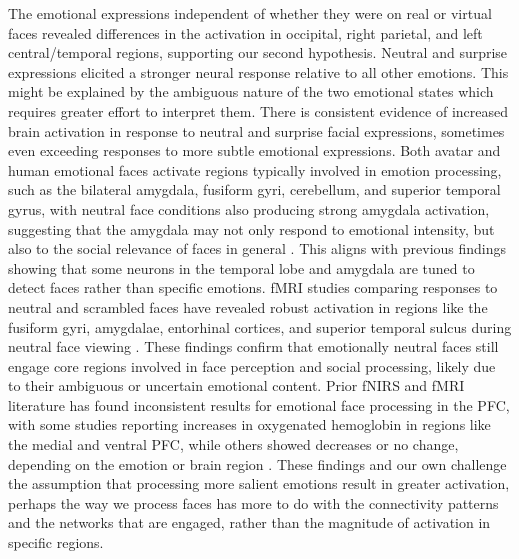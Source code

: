 The emotional expressions independent of whether they were on real or virtual faces revealed differences in the activation in occipital, right parietal, and left central/temporal regions, supporting our second hypothesis.
Neutral and surprise expressions elicited a stronger neural response relative to all other emotions.
This might be explained by the ambiguous nature of the two emotional states which requires greater effort to interpret them. 
There is consistent evidence of increased brain activation in response to neutral and surprise facial expressions, sometimes even exceeding responses to more subtle emotional expressions.
Both avatar and human emotional faces activate regions typically involved in emotion processing, such as the bilateral amygdala, fusiform gyri, cerebellum, and superior temporal gyrus, with neutral face conditions also producing strong amygdala activation, suggesting that the amygdala may not only respond to emotional intensity, but also to the social relevance of faces in general \citep{moser_amygdala_2007}. 
This aligns with previous findings showing that some neurons in the temporal lobe and amygdala are tuned to detect faces rather than specific emotions.
fMRI studies comparing responses to neutral and scrambled faces have revealed robust activation in regions like the fusiform gyri, amygdalae, entorhinal cortices, and superior temporal sulcus during neutral face viewing \citep{keslerwest_neural_2001}. 
These findings confirm that emotionally neutral faces still engage core regions involved in face perception and social processing, likely due to their ambiguous or uncertain emotional content.
Prior fNIRS and fMRI literature has found inconsistent results for emotional face processing in the PFC, with some studies reporting increases in oxygenated hemoglobin in regions like the medial and ventral PFC, while others showed decreases or no change, depending on the emotion or brain region \citep{westgarth_systematic_2021}. 
These findings and our own challenge the assumption that processing more salient emotions result in greater activation, perhaps the way we process faces has more to do with the connectivity patterns and the networks that are engaged, rather than the magnitude of activation in specific regions.

